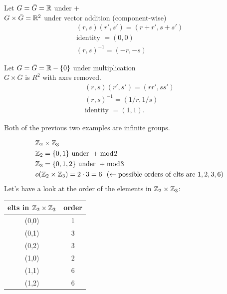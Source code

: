\begin{example}[HW\#5 Problem 4]
    Let $G=\bar{G}={\mathbb{ R}}$ under $+$ \\ 
    $G\times \bar{G}= {\mathbb{ R}}^2$ under vector addition (component-wise) \\
    \begin{align}
        (r,s)(r',s')=(r+r',s+s') \nonumber \\
        \text{identity }= (0,0) \nonumber \\
        (r,s)^{-1}= (-r,-s) \nonumber
    \end{align}
\end{example}
\begin{example}
    Let $G=\bar{G}={\mathbb{ R}}-\{0\}$ under multiplication \\
    $G\times \bar{G}$ is $R^2$ with axes removed. \\
    \begin{align}
        (r,s)(r',s')=(rr',ss') \nonumber \\
        (r,s)^{-1} = (1/r,1/s) \nonumber \\
        \text{identity }= (1,1). \nonumber
    \end{align}
\end{example}
\noindent Both of the previous two examples are infinite groups.
\begin{example}
\begin{align}
    &{\mathbb{ Z}}_2\times {\mathbb{ Z}}_3 \nonumber \\
    &{\mathbb{ Z}}_2 = \{0,1\} \text{ under }+\bmod 2 \nonumber \\
    &{\mathbb{ Z}}_3 = \{0,1,2\} \text{ under }+\bmod 3 \nonumber \\
    &o({\mathbb{ Z}}_2\times {\mathbb{ Z}}_3)= 2\cdot 3 = 6  \ \  (\leftarrow \text{possible orders of elts are } 1, 2, 3, 6)\nonumber 
\end{align}
Let's have a look at the order of the elements in ${\mathbb{ Z}}_2\times {\mathbb{ Z}}_3$:
\begin{table}[h!]
    \centering
    \begin{tabular}{c|c}
         elts in ${\mathbb{ Z}}_2\times {\mathbb{ Z}}_3$& order   \\ \hline
         (0,0) & 1 \\
         (0,1) & 3 \\
         (0,2) & 3 \\
         (1,0) & 2 \\
         (1,1) & 6 \\
         (1,2) & 6 
    \end{tabular}
    \label{tab:elts_Z2_cross_Z3}
\end{table}
\end{example}

